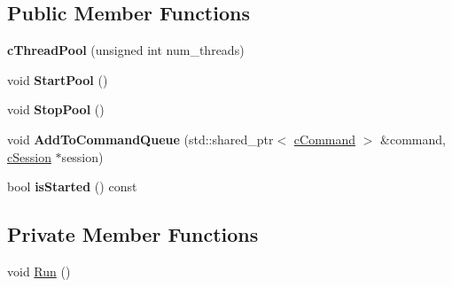 \subsection*{Public Member Functions}
\begin{DoxyCompactItemize}
\item 
\hypertarget{classengine_1_1cThreadPool_a1cef23416a63c1a652d07b074a40b42e}{{\bfseries c\-Thread\-Pool} (unsigned int num\-\_\-threads)}\label{classengine_1_1cThreadPool_a1cef23416a63c1a652d07b074a40b42e}

\item 
\hypertarget{classengine_1_1cThreadPool_a97cf0269aebd226e59d973a89181d709}{void {\bfseries Start\-Pool} ()}\label{classengine_1_1cThreadPool_a97cf0269aebd226e59d973a89181d709}

\item 
\hypertarget{classengine_1_1cThreadPool_aeafab9fa5546e10b0deebff1e8df60d9}{void {\bfseries Stop\-Pool} ()}\label{classengine_1_1cThreadPool_aeafab9fa5546e10b0deebff1e8df60d9}

\item 
\hypertarget{classengine_1_1cThreadPool_a755828410b0f6a32c3cb2c3f88a4c0a4}{void {\bfseries Add\-To\-Command\-Queue} (std\-::shared\-\_\-ptr$<$ \hyperlink{classengine_1_1cCommand}{c\-Command} $>$ \&command, \hyperlink{classengine_1_1cSession}{c\-Session} $\ast$session)}\label{classengine_1_1cThreadPool_a755828410b0f6a32c3cb2c3f88a4c0a4}

\item 
\hypertarget{classengine_1_1cThreadPool_a207b8bcf506d3cd151f0fc815772111c}{bool {\bfseries is\-Started} () const }\label{classengine_1_1cThreadPool_a207b8bcf506d3cd151f0fc815772111c}

\end{DoxyCompactItemize}
\subsection*{Private Member Functions}
\begin{DoxyCompactItemize}
\item 
void \hyperlink{classengine_1_1cThreadPool_af573f11026d6b6079c56af7e50df5ca6}{Run} ()
\end{DoxyCompactItemize}
